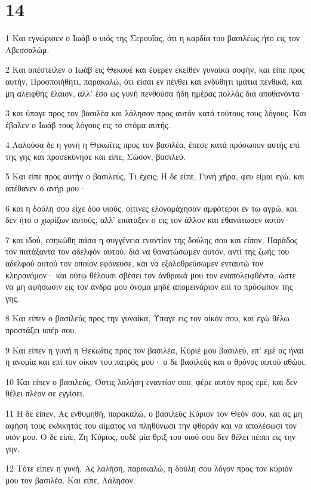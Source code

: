 \chapter{14}

\par 1 Και εγνώρισεν ο Ιωάβ ο υιός της Σερουΐας, ότι η καρδία του βασιλέως ήτο εις τον Αβεσσαλώμ.
\par 2 Και απέστειλεν ο Ιωάβ εις Θεκουέ και έφερεν εκείθεν γυναίκα σοφήν, και είπε προς αυτήν, Προσποιήθητι, παρακαλώ, ότι είσαι εν πένθει και ενδύθητι ιμάτια πενθικά, και μη αλειφθής έλαιον, αλλ' έσο ως γυνή πενθούσα ήδη ημέρας πολλάς διά αποθανόντα·
\par 3 και ύπαγε προς τον βασιλέα και λάλησον προς αυτόν κατά τούτους τους λόγους. Και έβαλεν ο Ιωάβ τους λόγους εις το στόμα αυτής.
\par 4 Λαλούσα δε η γυνή η Θεκωΐτις προς τον βασιλέα, έπεσε κατά πρόσωπον αυτής επί της γης και προσεκύνησε και είπε, Σώσον, βασιλεύ.
\par 5 Και είπε προς αυτήν ο βασιλεύς, Τι έχεις; Η δε είπε, Γυνή χήρα, φευ είμαι εγώ, και απέθανεν ο ανήρ μου·
\par 6 και η δούλη σου είχε δύο υιούς, οίτινες ελογομάχησαν αμφότεροι εν τω αγρώ, και δεν ήτο ο χωρίζων αυτούς, αλλ' επάταξεν ο εις τον άλλον και εθανάτωσεν αυτόν·
\par 7 και ιδού, εσηκώθη πάσα η συγγένεια εναντίον της δούλης σου και είπον, Παράδος τον πατάξαντα τον αδελφόν αυτού, διά να θανατώσωμεν αυτόν, αντί της ζωής του αδελφού αυτού τον οποίον εφόνευσε, και να εξολοθρεύσωμεν ενταυτώ τον κληρονόμον· και ούτω θέλουσι σβέσει τον άνθρακά μου τον εναπολειφθέντα, ώστε να μη αφήσωσιν εις τον άνδρα μου όνομα μηδέ απομεινάριον επί το πρόσωπον της γης.
\par 8 Και είπεν ο βασιλεύς προς την γυναίκα, Ύπαγε εις τον οίκόν σου, και εγώ θέλω προστάξει υπέρ σου.
\par 9 Και είπεν η γυνή η Θεκωΐτις προς τον βασιλέα, Κύριέ μου βασιλεύ, επ' εμέ ας ήναι η ανομία και επί τον οίκον του πατρός μου· ο δε βασιλεύς και ο θρόνος αυτού αθώοι.
\par 10 Και είπεν ο βασιλεύς, Όστις λαλήση εναντίον σου, φέρε αυτόν προς εμέ, και δεν θέλει πλέον σε εγγίσει.
\par 11 Η δε είπεν, Ας ενθυμηθή, παρακαλώ, ο βασιλεύς Κύριον τον Θεόν σου, και ας μη αφήση τους εκδικητάς του αίματος να πληθύνωσι την φθοράν και να απολέσωσι τον υιόν μου. Ο δε είπε, Ζη Κύριος, ουδέ μία θριξ του υιού σου δεν θέλει πέσει εις την γην.
\par 12 Τότε είπεν η γυνή, Ας λαλήση, παρακαλώ, η δούλη σου λόγον προς τον κύριόν μου τον βασιλέα. Και είπε, Λάλησον.
